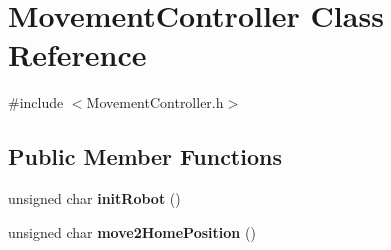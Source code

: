 \hypertarget{class_movement_controller}{}\section{Movement\+Controller Class Reference}
\label{class_movement_controller}


{\ttfamily \#include $<$Movement\+Controller.\+h$>$}

\subsection*{Public Member Functions}
\begin{DoxyCompactItemize}
\item 
\mbox{\label{class_movement_controller_aed25a9c08f44c223108137bc932ddd35}} 
unsigned char {\bfseries init\+Robot} ()
\item 
\mbox{\label{class_movement_controller_a2c60a9e0f4750a9ffa08196270795166}} 
unsigned char {\bfseries move2\+Home\+Position} ()
\end{DoxyCompactItemize}
